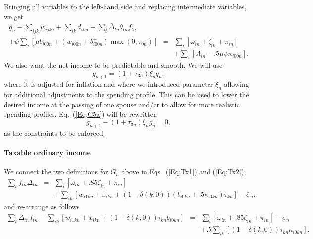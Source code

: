 \documentclass{article}[fleqn,12pt]
\begin{document}
	Bringing all variables to the left-hand side and replacing intermediate variables, we get
	\begin{eqnarray}
		\label{Eq:C4}
		g_n - \sum_{ijk} w_{ijkn} + \sum_{ik}d_{ikn}
		+ \sum_t \bar{\Delta}_{t n}\theta_{t n} f_{t n}&&\nonumber \\
		+ \psi \sum_{i} [\mu b_{i00n} + (w_{i00n} + b^-_{i00n})\max(0, \tau_{0n})] 
		&= & \sum_i [\omega_{in} + \bar{\zeta}_{in} + \pi_{in} ] \nonumber\\
		&& + \sum_i [\Lambda_{in} - .5\mu\psi\kappa_{i00n}].
	\end{eqnarray}
	We also want the net income to be predictable and smooth. We will use
\begin{equation}
	\label{Eq:C5a}
	g_{n+1} = (1+\tau_{3n})\xi_n g_n,
\end{equation}
where it is adjusted for inflation and where we introduced parameter $\xi_n$ 
allowing for additional adjustments to the spending profile.
This can be used to lower the desired income at the passing of one spouse and/or to 
allow for more realistic spending profiles.
Eq.~(\ref{Eq:C5a}) will be rewritten
\begin{equation}
	\label{Eq:C5}
	g_{n+1} - (1+\tau_{3n})\xi_n g_n = 0,
\end{equation}
as the constraints to be enforced.

\paragraph*{Taxable ordinary income}
	We connect the two definitions for $G_n$ above in Eqs.~(\ref{Eq:Tx1}) and (\ref{Eq:Tx2}),
	\begin{eqnarray}
		\sum_t f_{t n}\bar{\Delta}_{t n} &=&
		\sum_i [\omega_{in} + .85\bar\zeta_{in} + \pi_{in}]  \nonumber \\
		&& + \sum_{ik} [w_{i1kn} + x_{ikn} + (1 - \delta(k, 0))(b_{i0kn} +
		.5\kappa_{i0kn})\tau_{kn}] - \bar{\sigma}_n,
	\end{eqnarray}
	and re-arrange as follows
	\begin{eqnarray}
		\label{Eq:C6}
		\sum_t \bar{\Delta}_{t n} f_{t n}
		- \sum_{ik} [
			w_{i1kn} + x_{ikn} +
			(1 - \delta(k, 0))\tau_{kn}b_{i0kn}] &=&
		\sum_i [\omega_{in} + .85\bar\zeta_{in} + \pi_{in} ] 
		- \bar{\sigma}_n
		\nonumber \\
		&& + .5\sum_{ik} [(1-\delta(k, 0))\tau_{kn}\kappa_{i0kn}].
	\end{eqnarray}
\end{document}
